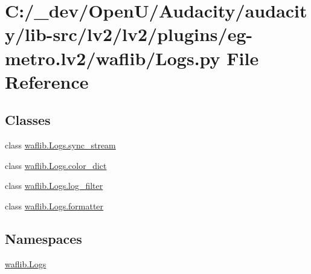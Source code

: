 \hypertarget{lv2_2plugins_2eg-metro_8lv2_2waflib_2_logs_8py}{}\section{C\+:/\+\_\+dev/\+Open\+U/\+Audacity/audacity/lib-\/src/lv2/lv2/plugins/eg-\/metro.lv2/waflib/\+Logs.py File Reference}
\label{lv2_2plugins_2eg-metro_8lv2_2waflib_2_logs_8py}
\subsection*{Classes}
\begin{DoxyCompactItemize}
\item 
class \hyperlink{classwaflib_1_1_logs_1_1sync__stream}{waflib.\+Logs.\+sync\+\_\+stream}
\item 
class \hyperlink{classwaflib_1_1_logs_1_1color__dict}{waflib.\+Logs.\+color\+\_\+dict}
\item 
class \hyperlink{classwaflib_1_1_logs_1_1log__filter}{waflib.\+Logs.\+log\+\_\+filter}
\item 
class \hyperlink{classwaflib_1_1_logs_1_1formatter}{waflib.\+Logs.\+formatter}
\end{DoxyCompactItemize}
\subsection*{Namespaces}
\begin{DoxyCompactItemize}
\item 
 \hyperlink{namespacewaflib_1_1_logs}{waflib.\+Logs}
\end{DoxyCompactItemize}
